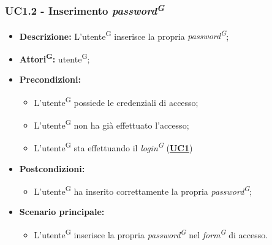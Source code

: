 \subsubsection{UC1.2 - Inserimento \textit{password\textsuperscript{G}}}
\label{sec:UC1.2}
\begin{itemize}
	\item \textbf{Descrizione:} L’utente\textsuperscript{G} inserisce la propria \textit{password\textsuperscript{G}};
	\item \textbf{Attori\textsuperscript{G}:} utente\textsuperscript{G};
	\item \textbf{Precondizioni:} 
	\begin{itemize}
		\item L’utente\textsuperscript{G} possiede le credenziali di accesso;
		\item L’utente\textsuperscript{G} non ha già effettuato l’accesso;
		\item L’utente\textsuperscript{G} sta effettuando il \textit{login\textsuperscript{G}} (\hyperref[sec:UC1]{\textbf{UC1}})
	\end{itemize}
	\item \textbf{Postcondizioni:} 
	\begin{itemize}
		\item L’utente\textsuperscript{G} ha inserito correttamente la propria \textit{password\textsuperscript{G}};
	\end{itemize}
	\item \textbf{Scenario principale:} 
	\begin{itemize}
		\item L’utente\textsuperscript{G} inserisce la propria \textit{password\textsuperscript{G}} nel \textit{form\textsuperscript{G}} di accesso.
	\end{itemize}
\end{itemize}

